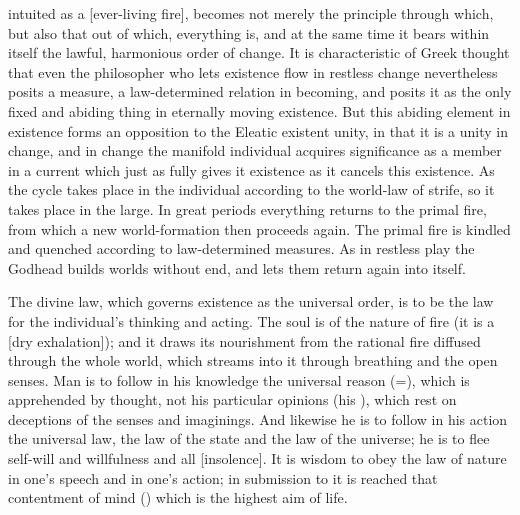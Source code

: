 intuited as a  [ever-living fire], becomes not merely the principle through
which, but also that out of which, everything is, and at the same time
it bears within itself the lawful, harmonious order of change. It is
characteristic of Greek thought that even the philosopher who lets
existence flow in restless change nevertheless posits a measure, a
law-determined relation in becoming, and posits it as the only fixed
and abiding thing in eternally moving existence. But this abiding
element in existence forms an opposition to the Eleatic existent unity,
in that it is a unity in change, and in change the manifold individual
acquires significance as a member in a current which just as fully
gives it existence as it cancels this existence. As the cycle takes
place in the individual according to the world-law of strife, so it
takes place in the large. In great periods everything returns to the
primal fire, from which a new world-formation then proceeds again. The
primal fire is kindled and quenched according to law-determined
measures. As in restless play the Godhead builds worlds without end,
and lets them return again into itself.

The divine law, which governs existence as the universal order, is to
be the law for the individual's thinking and acting. The soul is of the
nature of fire (it is a  [dry exhalation]); and
it draws its nourishment from the rational fire diffused through the
whole world, which streams into it through breathing and the open
senses. Man is to follow in his knowledge the universal reason
(=), which is apprehended by thought, not his
particular opinions (his ), which rest on deceptions
of the senses and imaginings. And likewise he is to follow in his
action the universal law, the law of the state and the law of the
universe; he is to flee self-will and willfulness and all 
[insolence]. It is wisdom to obey the law of nature in one's
speech and in one's action; in submission to it
is reached that contentment of mind () which is the
highest aim of life.

